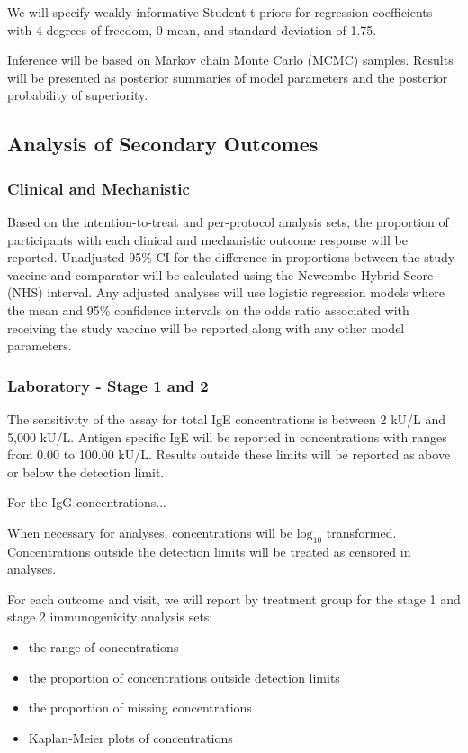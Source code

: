 \documentclass{bmcart}
\begin{document}
We will specify weakly informative Student t priors for regression coefficients with 4 degrees of freedom, 0 mean, and standard deviation of 1.75.

Inference will be based on Markov chain Monte Carlo (MCMC) samples.
Results will be presented as posterior summaries of model parameters and the posterior probability of superiority.

\subsection*{Analysis of Secondary Outcomes}

\subsubsection*{Clinical and Mechanistic}

Based on the intention-to-treat and per-protocol analysis sets, the proportion of participants with each clinical and mechanistic outcome response will be reported.
Unadjusted 95\% CI for the difference in proportions between the study vaccine and comparator will be calculated using the Newcombe Hybrid Score (NHS) interval.
Any adjusted analyses will use logistic regression models where the mean and 95\% confidence intervals on the odds ratio associated with receiving the study vaccine will be reported along with any other model parameters.

\subsubsection*{Laboratory - Stage 1 and 2}

The sensitivity of the assay for total IgE concentrations is between 2 kU/L and 5,000 kU/L.
Antigen specific IgE will be reported in concentrations with ranges from 0.00 to 100.00 kU/L.
Results outside these limits will be reported as above or below the detection limit.

For the IgG concentrations...

When necessary for analyses, concentrations will be $\text{log}_{10}$ transformed.
Concentrations outside the detection limits will be treated as censored in analyses.

For each outcome and visit, we will report by treatment group for the stage 1 and stage 2 immunogenicity analysis sets:
\begin{itemize}
	\item the range of concentrations
	\item the proportion of concentrations outside detection limits
	\item the proportion of missing concentrations
	\item Kaplan-Meier plots of concentrations
\end{itemize}
\end{document}
